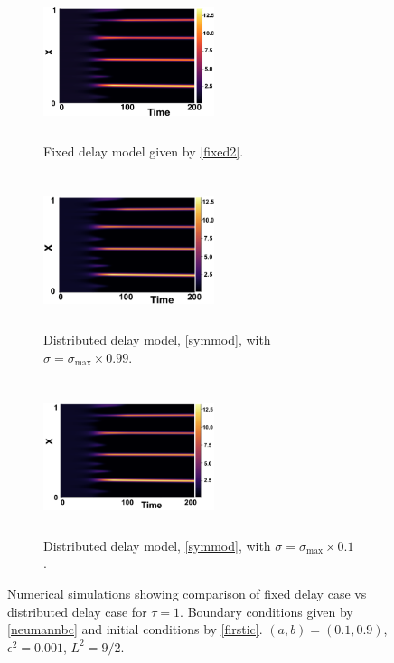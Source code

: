 \begin{figure}[H]
    \centering
    \begin{subfigure}[t]{0.32\textwidth}
        \centering
        \includegraphics[width=5cm,height=4.5cm]{ic21.png}
        \caption{Fixed delay model given by \eqref{fixed2}.}
        \label{}
    \end{subfigure}
    \hfill
    \begin{subfigure}[t]{0.32\textwidth}
        \centering
        \includegraphics[width=5cm,height=4.5cm]{distt1sigmax.png}
        \caption{Distributed delay model, \eqref{symmod}, with $\sigma=\sigma_{\max}\times0.99$.}
        \label{}
    \end{subfigure}
    \hfill
    \begin{subfigure}[t]{0.32\textwidth}
        \centering
        \includegraphics[width=5cm,height=4.5cm]{distt1sig10.png}
        \caption{Distributed delay model, \eqref{symmod}, with $\sigma=\sigma_{\max}\times0.1$.}
        \label{}
    \end{subfigure}
    \caption{Numerical simulations showing comparison of fixed delay case vs distributed delay case for $\tau=1$. Boundary conditions given by \eqref{neumannbc} and initial conditions by \eqref{firstic}. $(a,b)=(0.1,0.9)$, $\epsilon^2=0.001$, $L^2=9/2$. }
    \label{fig:distres1}
\end{figure}
